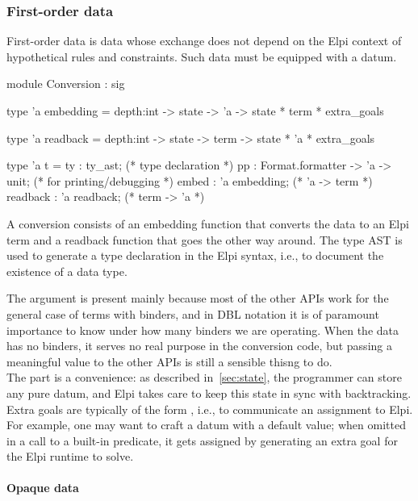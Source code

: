\documentclass[a4paper, 11pt]{book}
\begin{document}
\subsubsection{First-order data}\label{sec:fodata}\label{sec:opaquedata}

First-order data is data whose exchange does not depend on the Elpi context of
hypothetical rules and constraints. Such data must be equipped with a
 datum.

\begin{ocamlcode}
module Conversion : sig

type 'a embedding =
  depth:int ->
  state -> 'a -> state * term * extra_goals

type 'a readback =
  depth:int ->
  state -> term -> state * 'a * extra_goals

type 'a t = {
  ty : ty_ast;                         (* type declaration *)
  pp : Format.formatter -> 'a -> unit; (* for printing/debugging *)
  embed : 'a embedding;                (* 'a -> term *)
  readback : 'a readback;              (* term -> 'a *)
}
\end{ocamlcode}

\noindent

A conversion consists of an embedding function that converts the data to an
Elpi term and a readback function that goes the other way around. The type AST
 is used to generate a type declaration in the Elpi syntax, i.e.,
to document the existence of a data type.


The  argument is present mainly because most of the other APIs
work for the general case of terms with binders, and in DBL notation it is of
paramount importance to know under how many binders we are operating. When the
data has no binders, it serves no real purpose in the conversion code, but
passing a meaningful value to the other APIs is still a sensible thisng to do.\\
The  part is a convenience: as described in~\cref{sec:state},
the programmer can store any pure datum, and Elpi takes care to keep this
state in sync with backtracking.\\
Extra goals are typically of the form , i.e., to communicate an
assignment to Elpi. For example, one may want to craft a datum with a default
value; when omitted in a call to a built-in predicate, it gets assigned by
generating an extra goal for the Elpi runtime to solve.


\paragraph{Opaque data}
\end{document}
